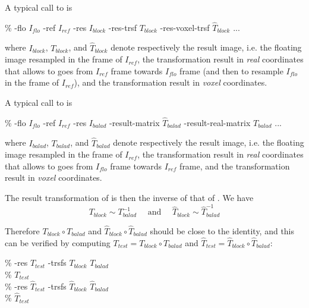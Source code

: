 
A typical call to \blockmatching is
\begin{code}{0.8}
\% \blockmatching -flo $I_{flo}$ -ref $I_{ref}$ -res $I_{block}$ 
   -res-trsf $T_{block}$ -res-voxel-trsf $\hat{T}_{block}$ ...
\end{code}
where $I_{block}$, $T_{block}$, and $\hat{T}_{block}$ denote respectively the result image, i.e. the floating image resampled in the frame of $I_{ref}$, the transformation result in \textit{real} coordinates that allows to goes from $I_{ref}$ frame towards $I_{flo}$ frame (and then to resample $I_{flo}$ in the frame of $I_{ref}$), and the transformation result in \textit{voxel} coordinates.

A typical call to \baladin is
\begin{code}{0.8}
\% \baladin -flo $I_{flo}$ -ref $I_{ref}$ -res $I_{balad}$ 
-result-matrix $\hat{T}_{balad}$ -result-real-matrix $T_{balad}$ ...
\end{code}
where $I_{balad}$, $T_{balad}$, and $\hat{T}_{balad}$ denote respectively the result image, i.e. the floating image resampled in the frame of $I_{ref}$, the transformation result in \textit{real} coordinates that allows to goes from $I_{flo}$ frame towards $I_{ref}$ frame, and the transformation result in \textit{voxel} coordinates.

\begin{attention} The result transformation of \baladin is then the inverse of that of \blockmatching. We have 
$$ T_{block} \sim T^{-1}_{balad} \quad \mbox{ and } \quad \hat{T}_{block} \sim \hat{T}^{-1}_{balad}
$$
\end{attention}

Therefore $T_{block} \circ T_{balad}$ and $\hat{T}_{block} \circ \hat{T}_{balad}$ should be close to the identity, and this can be verified by computing $T_{test} = T_{block} \circ T_{balad}$
and $\hat{T}_{test} = \hat{T}_{block} \circ \hat{T}_{balad}$:
\begin{code}{0.8}
\% \composeTrsf -res $T_{test}$ -trsfs $T_{block}$ $T_{balad}$ \\
\% \printTrsf $T_{test}$\\
\% \composeTrsf -res $\hat{T}_{test}$ -trsfs $\hat{T}_{block}$ $\hat{T}_{balad}$\\
\% \printTrsf $\hat{T}_{test}$
\end{code}

